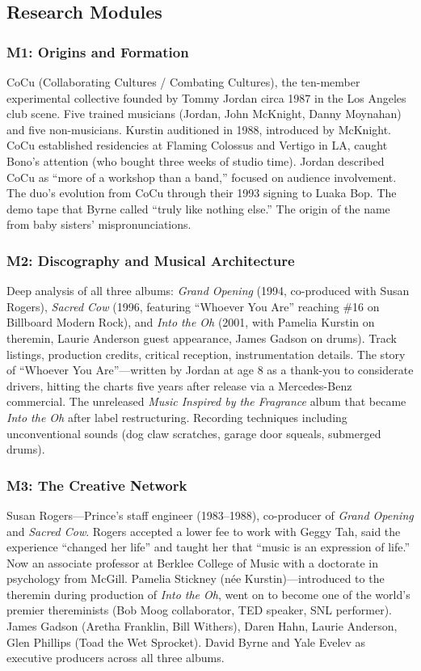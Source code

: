 \documentclass[11pt,letterpaper]{article}
\begin{document}
\subsection{Research Modules}

\subsubsection{M1: Origins and Formation}

CoCu (Collaborating Cultures / Combating Cultures), the ten-member experimental collective founded by Tommy Jordan circa 1987 in the Los Angeles club scene. Five trained musicians (Jordan, John McKnight, Danny Moynahan) and five non-musicians. Kurstin auditioned in 1988, introduced by McKnight. CoCu established residencies at Flaming Colossus and Vertigo in LA, caught Bono's attention (who bought three weeks of studio time). Jordan described CoCu as ``more of a workshop than a band,'' focused on audience involvement. The duo's evolution from CoCu through their 1993 signing to Luaka Bop. The demo tape that Byrne called ``truly like nothing else.'' The origin of the name from baby sisters' mispronunciations.

\subsubsection{M2: Discography and Musical Architecture}

Deep analysis of all three albums: \textit{Grand Opening} (1994, co-produced with Susan Rogers), \textit{Sacred Cow} (1996, featuring ``Whoever You Are'' reaching \#16 on Billboard Modern Rock), and \textit{Into the Oh} (2001, with Pamelia Kurstin on theremin, Laurie Anderson guest appearance, James Gadson on drums). Track listings, production credits, critical reception, instrumentation details. The story of ``Whoever You Are''---written by Jordan at age 8 as a thank-you to considerate drivers, hitting the charts five years after release via a Mercedes-Benz commercial. The unreleased \textit{Music Inspired by the Fragrance} album that became \textit{Into the Oh} after label restructuring. Recording techniques including unconventional sounds (dog claw scratches, garage door squeals, submerged drums).

\subsubsection{M3: The Creative Network}

Susan Rogers---Prince's staff engineer (1983--1988), co-producer of \textit{Grand Opening} and \textit{Sacred Cow}. Rogers accepted a lower fee to work with Geggy Tah, said the experience ``changed her life'' and taught her that ``music is an expression of life.'' Now an associate professor at Berklee College of Music with a doctorate in psychology from McGill. Pamelia Stickney (née Kurstin)---introduced to the theremin during production of \textit{Into the Oh}, went on to become one of the world's premier thereminists (Bob Moog collaborator, TED speaker, SNL performer). James Gadson (Aretha Franklin, Bill Withers), Daren Hahn, Laurie Anderson, Glen Phillips (Toad the Wet Sprocket). David Byrne and Yale Evelev as executive producers across all three albums.
\end{document}
